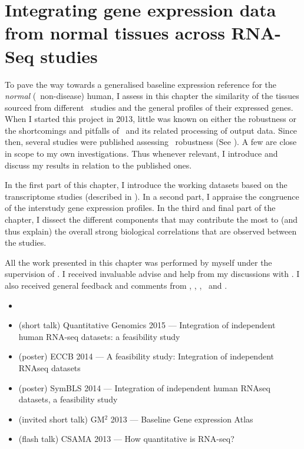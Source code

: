 \chapter{Integrating gene expression data from normal tissues across RNA-Seq studies}%
\label{ch:Transcriptomics}

\setlength{\epigraphwidth}{0.54\textwidth}
\setlength{\epigraphrule}{0pt}


\vspace*{0.7in}

To pave the way towards
a generalised baseline expression reference for the \emph{normal}
(\ie\ non-disease) human,
I assess in this chapter the similarity
of the tissues sourced from different \Rnaseq\ studies and
the general profiles of their expressed genes.
When I started this project in 2013,
little was known on either the robustness or
the shortcomings and pitfalls of \Rnaseq\ and
its related processing of output data.
Since then, several studies were published assessing \Rnaseq\
robustness (See ).
A few are close in scope to my own investigations.
Thus whenever relevant,
I introduce and discuss my results in relation to the published ones.\mybr\

In the first part of this chapter,
I introduce the working datasets based on the transcriptome studies
(described in \Cref{ch:datasets}).
In a second part,
I appraise the congruence of the interstudy gene expression profiles.
In the third and final part of the chapter,
I dissect the different components that
may contribute the most to (and thus explain)
the overall strong biological correlations that are observed between the studies.\mybr\

All the work presented in this chapter was performed by myself under the
supervision of \alvis.
I received invaluable advise and help from my discussions with \nuno.
I also received general feedback and comments from \mar, \johan, \sarah, \gos\
and \wolfgang.\mybr\
\clearpage

\derivativeWork{}
\begin{itemize}[topsep=0pt,nosep]
    \item\hspace{-1.8mm}
    \item (short talk) Quantitative Genomics 2015 --- Integration of
        independent human RNA-seq datasets: a feasibility study
    \item (poster) ECCB 2014 --- A feasibility study:
        Integration of independent RNAseq datasets
    \item (poster) SymBLS 2014 --- Integration of independent human
        RNAseq datasets, a feasibility study
    \item (invited short talk) GM$^2$ 2013 --- Baseline Gene expression Atlas
    \item (flash talk) CSAMA 2013 --- How quantitative is RNA-seq?
\end{itemize}
\clearpage

